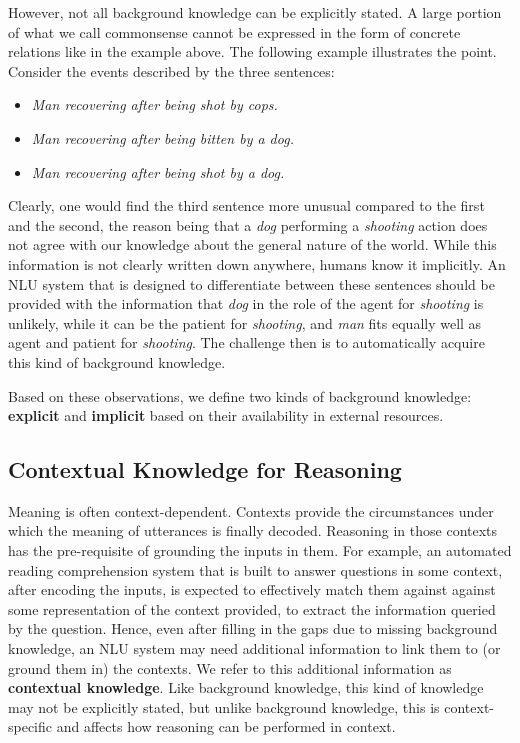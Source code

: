 However, not all background knowledge can be explicitly stated. A large portion of what we call
commonsense cannot be expressed in the form of concrete relations like in the example above.  The
following example illustrates the point. Consider the events described by the three sentences:

\begin{itemize} \item[] \textit{Man recovering after being shot by cops.} \item[] \textit{Man
recovering after being bitten by a dog.} \item[] \textit{Man recovering after being shot by a dog.}
\end{itemize}

Clearly, one would find the third sentence more unusual compared to the first and the second, the
reason being that a \emph{dog} performing a \emph{shooting} action does not agree with our knowledge
about the general nature of the world. While this information is not clearly written down anywhere,
humans know it implicitly. An NLU system that is designed to differentiate between these sentences
should be provided with the information that \emph{dog} in the role of the agent for \emph{shooting}
is unlikely, while it can be the patient for \emph{shooting}, and \emph{man} fits equally well as
agent and patient for \emph{shooting}. The challenge then is to automatically acquire this kind of
background knowledge.

Based on these observations, we define two kinds of background knowledge: \textbf{explicit} and
\textbf{implicit} based on their availability in external resources.


\subsection{Contextual Knowledge for Reasoning}
Meaning is often context-dependent. Contexts provide the circumstances under which the meaning of
utterances is finally decoded. Reasoning in those contexts has the pre-requisite of grounding the
inputs in them.  For example, an automated reading comprehension system that is built to answer
questions in some context, after encoding the inputs, is expected to effectively match them against
against some representation of the context provided, to extract the information queried by the
question.  Hence, even after filling in the gaps due to missing background knowledge, an NLU system
may need additional information to link them to (or ground them in) the contexts.  We refer to this
additional information as \textbf{contextual knowledge}.  Like background knowledge, this kind of
knowledge may not be explicitly stated, but unlike background knowledge, this is context-specific and
affects how reasoning can be performed in context.

